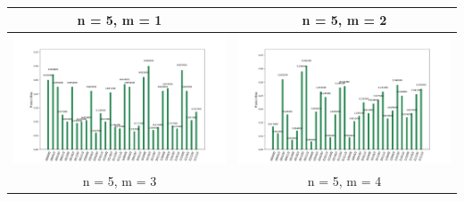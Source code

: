 \newpage
\begin{landscape}
\begin{table}[ht]
    \begin{tabular}{c c} 
        \hline
        n = 5, m = 1 & n = 5, m = 2 \\ \hline
        \includegraphics[scale=0.32]{Grover_results/Grover_n=5,m=1.png} & \includegraphics[scale=0.32]{Grover_results/Grover_n=5,m=2.png} \\ \hline
        n = 5, m = 3 & n = 5, m = 4 \\ \hline

\end{tabular}
\end{table}
\end{landscape}
